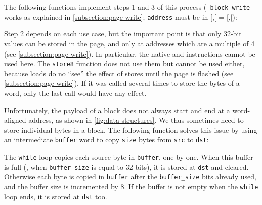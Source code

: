 The following functions implement steps 1 and 3 of this process ({\tt
block\_write} works as explained in \cref{subsection:page-write}; {\tt address}
must be in [,[ =
[,[):


Step 2 depends on each use case, but the important point is that only 32-bit
values can be stored in the page, and only at addresses which are a multiple of
4 (see \cref{subsection:page-write}). In particular, the native  and
 instructions cannot be used here. The {\tt store8} function does not
use them but cannot be used either, because loads do no ``see'' the effect of
stores until the page is flashed (see \cref{subsection:page-write}). If it was
called several times to store the bytes of a word, only the last call would
have any effect.

Unfortunately, the payload of a block does not always start and end at a
word-aligned address, as shown in \cref{fig:data-structures}. We thus sometimes
need to store individual bytes in a block. The following function solves this
issue by using an intermediate {\tt buffer} word to copy {\tt size} bytes from
{\tt src} to {\tt dst}:


The {\tt while} loop copies each source byte in {\tt buffer}, one by one. When
this buffer is full (\ie, when {\tt buffer\_size} is equal to 32 bits), it is
stored at {\tt dst} and cleared. Otherwise each byte is copied in {\tt buffer}
after the {\tt buffer\_size} bits already used, and the buffer size is
incremented by 8. If the buffer is not empty when the {\tt while} loop ends, it
is stored at {\tt dst} too.

